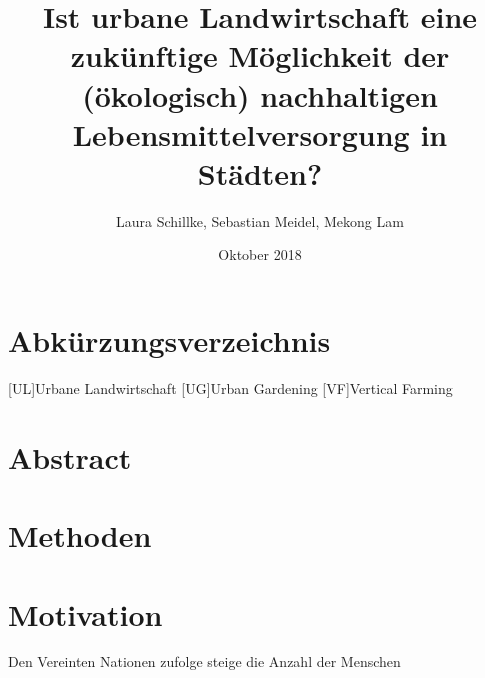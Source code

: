 \documentclass{scrartcl}
\title{Ist urbane Landwirtschaft eine zukünftige Möglichkeit der (ökologisch) nachhaltigen Lebensmittelversorgung in Städten?}
\author{Laura Schillke, Sebastian Meidel, Mekong Lam }
\date{Oktober 2018}
\begin{document}
\maketitle


\newpage

\setcounter{tocdepth}{2}
\tableofcontents 



\newpage
\section{Abkürzungsverzeichnis}

\begin{acronym}[Bash]
	[UL]{Urbane Landwirtschaft}
	[UG]{Urban Gardening}
	[VF]{Vertical Farming}
\end{acronym}


\newpage

\section{Abstract}

\section{Methoden}

\section{Motivation}
Den Vereinten Nationen zufolge steige die Anzahl der Menschen 




\end{document}
